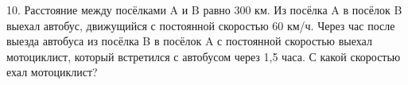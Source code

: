 10. Расстояние между посёлками A и B равно 300 км. Из посёлка A в посёлок B выехал автобус, движущийся с постоянной скоростью 60 км/ч. Через час после выезда автобуса из посёлка B в посёлок A с постоянной скоростью выехал мотоциклист, который встретился с автобусом через 1,5 часа. С какой скоростью ехал мотоциклист?\\
